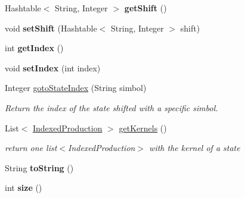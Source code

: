 \begin{DoxyCompactItemize}
\item 
\hypertarget{classcontext_free_1_1scanner_1_1_state_aa4d50d40914124e22010dd49f54da845}{Hashtable$<$ String, Integer $>$ {\bfseries get\-Shift} ()}\label{classcontext_free_1_1scanner_1_1_state_aa4d50d40914124e22010dd49f54da845}

\item 
\hypertarget{classcontext_free_1_1scanner_1_1_state_adf18642bb9c193b9a3b0a6ba73bddc14}{void {\bfseries set\-Shift} (Hashtable$<$ String, Integer $>$ shift)}\label{classcontext_free_1_1scanner_1_1_state_adf18642bb9c193b9a3b0a6ba73bddc14}

\item 
\hypertarget{classcontext_free_1_1scanner_1_1_state_acefc45a10d2cdbfbbfad972621c7c2a2}{int {\bfseries get\-Index} ()}\label{classcontext_free_1_1scanner_1_1_state_acefc45a10d2cdbfbbfad972621c7c2a2}

\item 
\hypertarget{classcontext_free_1_1scanner_1_1_state_abef790a67f08f3e5afb6f0114e97585f}{void {\bfseries set\-Index} (int index)}\label{classcontext_free_1_1scanner_1_1_state_abef790a67f08f3e5afb6f0114e97585f}

\item 
Integer \hyperlink{classcontext_free_1_1scanner_1_1_state_a5259b186755c072d90d06dceb2b756ac}{goto\-State\-Index} (String simbol)
\begin{DoxyCompactList}\small\item\em Return the index of the state shifted with a specific simbol. \end{DoxyCompactList}\item 
List$<$ \hyperlink{classcontext_free_1_1scanner_1_1_indexed_production}{Indexed\-Production} $>$ \hyperlink{classcontext_free_1_1scanner_1_1_state_a987d4c7ae8eb2754f13f0099f5d861a5}{get\-Kernels} ()
\begin{DoxyCompactList}\small\item\em return one list$<$\-Indexed\-Production$>$ with the kernel of a state \end{DoxyCompactList}\item 
\hypertarget{classcontext_free_1_1scanner_1_1_state_aec3a0f8337a27e244b82beb41c895e7f}{String {\bfseries to\-String} ()}\label{classcontext_free_1_1scanner_1_1_state_aec3a0f8337a27e244b82beb41c895e7f}

\item 
\hypertarget{classcontext_free_1_1scanner_1_1_state_a5ae1ce923c003367c33cc3f85f19181b}{int {\bfseries size} ()}\label{classcontext_free_1_1scanner_1_1_state_a5ae1ce923c003367c33cc3f85f19181b}

\end{DoxyCompactItemize}

